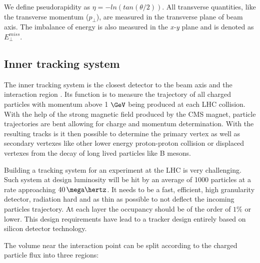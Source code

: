 We define pseudorapidity as $\eta = -ln(tan(\theta/2))$. All transverse quantities, like the transverse momentum ($p_\perp$), are measured in the transverse plane of beam axis. The imbalance of energy is also measured in the \textit{x-y} plane and is denoted as $E^{miss}_\perp$.

\subsection{Inner tracking system}
\label{SUBSECTION:ExperimentalApparatus_CMS_Tracker}

%

The inner tracking system is the closest detector to the beam axis and the interaction region \cite{CMSTDR:CMSTracker,CMSTDR:CMSTrackerAddendum}. Its function is to measure the trajectory of all charged particles with momentum above 1 $\GeV$ being produced at each \gls{LHC} collision. With the help of the strong magnetic field produced by the \gls{CMS} magnet, particle trajectories are bent allowing for charge and momentum determination. With the resulting tracks is it then possible to determine the primary vertex as well as secondary vertexes like other lower energy proton-proton collision or displaced vertexes from the decay of long lived particles like B mesons.

Building a tracking system for an experiment at the \gls{LHC} is very challenging. Such system at design luminosity will be hit by an average of 1000 particles at a rate approaching $40\,\mega\hertz$. It needs to be a fast, efficient, high granularity detector, radiation hard and as thin as possible to not deflect the incoming particles trajectory. At each layer the occupancy should be of the order of $1\%$ or lower. This design requirements have lead to a tracker design entirely based on silicon detector technology. 

The volume near the interaction point can be split according to the charged particle flux into three regions:

